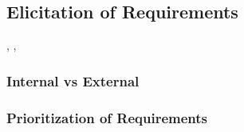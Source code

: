 \subsection{Elicitation of Requirements}
\cite{Cleland-Huang:2008}, \cite{Kaiya:2010}, \cite{Castro-Herrera:2009}
\subsubsection{Internal vs External}

\subsubsection{Prioritization of Requirements} 
